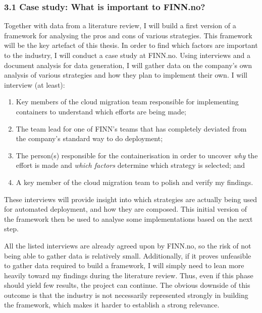 \subsubsection{3.1 Case study: What is important to
FINN.no?}\label{case-study-what-is-important-to-finn.no}

Together with data from a literature review, I will build a first
version of a framework for analysing the pros and cons of various
strategies. This framework will be the key artefact of this thesis. In
order to find which factors are important to the industry, I will
conduct a case study at FINN.no. Using interviews and a document
analysis for data generation, I will gather data on the company's own
analysis of various strategies and how they plan to implement their own.
I will interview (at least):

\begin{enumerate}
\def\labelenumi{\arabic{enumi}.}
\tightlist
\item
  Key members of the cloud migration team responsible for implementing
  containers to understand which efforts are being made;
\item
  The team lead for one of FINN's teams that has completely deviated
  from the company's standard way to do deployment;
\item
  The person(s) responsible for the containerisation in order to uncover
  \emph{why} the effort is made and \emph{which factors} determine which
  strategy is selected; and
\item
  A key member of the cloud migration team to polish and verify my
  findings.
\end{enumerate}

These interviews will provide insight into which strategies are actually
being used for automated deployment, and how they are composed. This
initial version of the framework then be used to analyse some
implementations based on the next step.

All the listed interviews are already agreed upon by FINN.no, so the
risk of not being able to gather data is relatively small. Additionally,
if it proves unfeasible to gather data required to build a framework, I
will simply need to lean more heavily toward my findings during the
literature review. Thus, even if this phase should yield few results,
the project can continue. The obvious downside of this outcome is that
the industry is not necessarily represented strongly in building the
framework, which makes it harder to establish a strong relevance.

